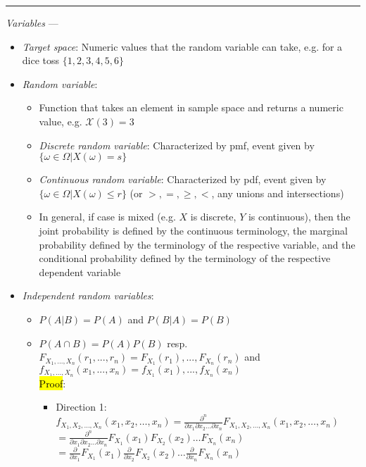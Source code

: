 {\color{lightgray}\hrule height 0.001mm}

\emph{Variables} --- 
\begin{itemize}
    \item \emph{Target space}: Numeric values that the random variable can take, e.g. for a dice toss $\{ 1,2,3,4,5,6\}$
    \item \emph{Random variable}:
    \begin{itemize}
        \item Function that takes an element in sample space and returns a numeric value, e.g. $\mathcal{X}(3) = 3$
        \item \emph{Discrete random variable}: Characterized by pmf, event given by $\{ \omega \in \Omega |X(\omega) = s\}$
        \item \emph{Continuous random variable}: Characterized by pdf, event given by $\{ \omega \in \Omega |X(\omega) \leq r\}$ (or $>, =, \geq, <$, any unions and intersections)
        \item In general, if case is mixed (e.g. $X$ is discrete, $Y$ is continuous), then the joint probability is defined by the continuous terminology, the marginal probability defined by the terminology of the respective variable, and the conditional probability defined by the terminology of the respective dependent variable
    \end{itemize}
    \item \emph{Independent random variables}:
    \begin{itemize}
        \item $P(A|B) = P(A)$ and $P(B|A) = P(B)$ 
        \item $P(A \cap B) = P(A)P(B)$ resp. $F_{X_1, ..., X_n}(r_1, ..., r_n) = F_{X_1}(r_1), ..., F_{X_n}(r_n)$ and $f_{X_1, ..., X_n}(x_1, ..., x_n) = f_{X_1}(x_1), ..., f_{X_n}(x_n)$\\
        \hl{Proof}:
        \begin{itemize}
            \item Direction 1: $f_{X_1, X_2, \ldots, X_n}(x_1, x_2, \ldots, x_n) = \frac{\partial^n}{\partial x_1 \partial x_2 \ldots \partial x_n} F_{X_1, X_2, \ldots, X_n}(x_1, x_2, \ldots, x_n)$\\
            $= \frac{\partial^n}{\partial x_1 \partial x_2 \ldots \partial x_n} F_{X_1}(x_1) F_{X_2}(x_2) \ldots F_{X_n}(x_n)$\\
            $= \frac{\partial}{\partial x_1} F_{X_1}(x_1) \frac{\partial}{\partial x_2} F_{X_2}(x_2) \ldots \frac{\partial}{\partial x_n} F_{X_n}(x_n)$\\

\end{itemize}
\end{itemize}
\end{itemize}
